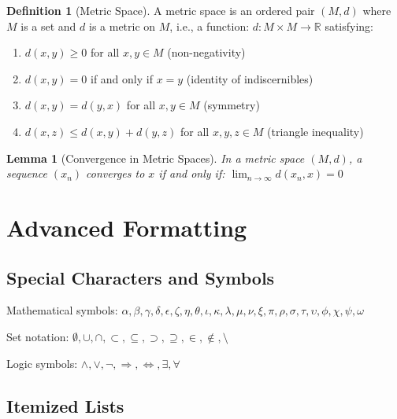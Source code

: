 \documentclass[12pt,a4paper,twoside]{article}
\newtheorem{lemma}[theorem]{Lemma}
\theoremstyle{definition}
\newtheorem{definition}[theorem]{Definition}
\newcommand{\R}{\mathbb{R}}
\begin{document}
\begin{definition}[Metric Space]
A metric space is an ordered pair $(M, d)$ where $M$ is a set and $d$ is a metric on $M$, i.e., a function:
$d: M \times M \to \R$
satisfying:
\begin{enumerate}
\item $d(x, y) \geq 0$ for all $x, y \in M$ (non-negativity)
\item $d(x, y) = 0$ if and only if $x = y$ (identity of indiscernibles)
\item $d(x, y) = d(y, x)$ for all $x, y \in M$ (symmetry)
\item $d(x, z) \leq d(x, y) + d(y, z)$ for all $x, y, z \in M$ (triangle inequality)
\end{enumerate}
\end{definition}

\begin{lemma}[Convergence in Metric Spaces]
In a metric space $(M, d)$, a sequence $(x_n)$ converges to $x$ if and only if:
$\lim_{n \to \infty} d(x_n, x) = 0$
\end{lemma}

\section{Advanced Formatting}

\subsection{Special Characters and Symbols}

Mathematical symbols: $\alpha, \beta, \gamma, \delta, \epsilon, \zeta, \eta, \theta, \iota, \kappa, \lambda, \mu, \nu, \xi, \pi, \rho, \sigma, \tau, \upsilon, \phi, \chi, \psi, \omega$

Set notation: $\emptyset, \cup, \cap, \subset, \subseteq, \supset, \supseteq, \in, \notin, \setminus$

Logic symbols: $\land, \lor, \neg, \Rightarrow, \Leftrightarrow, \exists, \forall$

\subsection{Itemized Lists}
\end{document}
